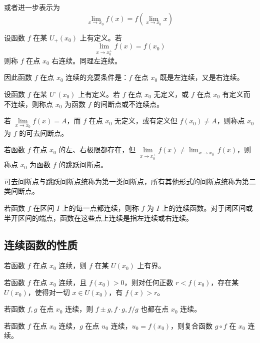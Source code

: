 或者进一步表示为
\[ \lim_{x\to x_0}f(x) = f\left(\lim_{x\to x_0}x\right) \]

\begin{definition}
	设函数 $f$ 在某 $U_+(x_0)$ 上有定义。若
	\[ \lim_{x\to x_0^+}f(x) = f(x_0) \]
	则称 $f$ 在点 $x_0$ 右连续。同理左连续。
\end{definition}

因此函数 $f$ 在点 $x_0$ 连续的充要条件是：$f$ 在点 $x_0$ 既是左连续，又是右连续。

\begin{definition}[间断点]
	设函数 $f$ 在某 $U^\circ(x_0)$ 上有定义。若 $f$ 在点 $x_0$ 无定义，或 $f$ 在点 $x_0$ 有定义而不连续，则称点 $x_0$ 为函数 $f$ 的间断点或不连续点。
\end{definition}

若 $\lim\limits_{x\to x_0}f(x)=A$，而 $f$ 在点 $x_0$ 无定义，或有定义但 $f(x_0)\ne A$，则称点 $x_0$ 为 $f$ 的可去间断点。

若函数 $f$ 在点 $x_0$ 的左、右极限都存在，但 $\lim\limits_{x\to x_0^+}f(x) \ne \lim_{x\to x_0^-}f(x)$，则称点 $x_0$ 为函数 $f$ 的跳跃间断点。

可去间断点与跳跃间断点统称为第一类间断点，所有其他形式的间断点统称为第二类间断点。

若函数 $f$ 在区间 $I$ 上的每一点都连续，则称 $f$ 为 $I$ 上的连续函数。对于闭区间或半开区间的端点，函数在这些点上连续是指左连续或右连续。

\subsection{连续函数的性质}

\begin{theorem}[局部有界性]
	若函数 $f$ 在点 $x_0$ 连续，则 $f$ 在某 $U(x_0)$ 上有界。
\end{theorem}

\begin{theorem}[局部保号性]
	若函数 $f$ 在点 $x_0$ 连续，且 $f(x_0)>0$，则对任何正数 $r<f(x_0)$，存在某 $U(x_0)$，使得对一切 $x\in U(x_0)$，有 $f(x)>r$。
\end{theorem}

\begin{theorem}[四则运算]
	若函数 $f,g$ 在点 $x_0$ 连续，则 $f\pm g,f\cdot g,f/g$ 也都在点 $x_0$ 连续。
\end{theorem}

\begin{theorem}
	若函数 $f$ 在点 $x_0$ 连续，$g$ 在点 $u_0$ 连续，$u_0=f(x_0)$，则复合函数 $g\circ f$ 在 $x_0$ 连续。
\end{theorem}

